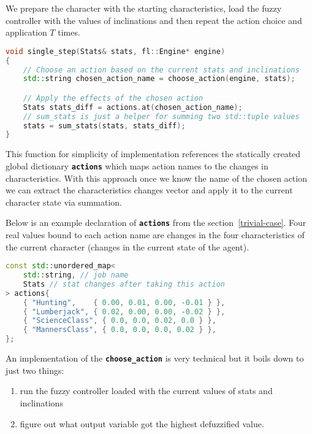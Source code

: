 \documentclass[12pt, a4paper]{report}
\begin{document}
	We prepare the character with the starting characteristics, load the fuzzy controller with the values of inclinations and then repeat the action choice and application $T$ times.
	
	\begin{lstlisting}[language=c++]
void single_step(Stats& stats, fl::Engine* engine)
{
	// Choose an action based on the current stats and inclinations
	std::string chosen_action_name = choose_action(engine, stats);

	// Apply the effects of the chosen action
	Stats stats_diff = actions.at(chosen_action_name);
	// sum_stats is just a helper for summing two std::tuple values
	stats = sum_stats(stats, stats_diff);
}
	\end{lstlisting}
	
	This function for simplicity of implementation references the statically created global dictionary \textbf{\texttt{actions}} which maps action names to the changes in characteristics.
	With this approach once we know the name of the chosen action we can extract the characteristics changes vector and apply it to the current character state via summation.
	
	Below is an example declaration of \textbf{\texttt{actions}} from the section~\ref{trivial-case}.
	Four real values bound to each action name are changes in the four characteristics of the current character (changes in the current state of the agent).
	
	\begin{lstlisting}[language=c++]
const std::unordered_map<
	std::string, // job name
	Stats // stat changes after taking this action
> actions{
	{ "Hunting",    { 0.00, 0.01, 0.00, -0.01 } },
	{ "Lumberjack", { 0.02, 0.00, 0.00, -0.02 } },
	{ "ScienceClass", { 0.0, 0.0, 0.02, 0.0 } },
	{ "MannersClass", { 0.0, 0.0, 0.0, 0.02 } },
};	
	\end{lstlisting}
	
	An implementation of the \textbf{\texttt{choose\_action}} is very technical but it boils down to just two things:
	
	\begin{enumerate}
		\item run the fuzzy controller loaded with the current values of stats and inclinations
		\item figure out what output variable got the highest defuzzified value.
	\end{enumerate}
	
\end{document}
